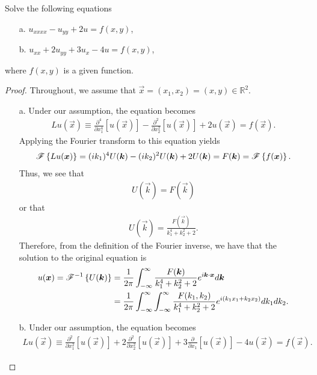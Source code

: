 \begin{problem}{2.54}
  Solve the following equations
  \begin{enumerate}
    \item[a.] $u_{xxxx} - u_{yy} + 2u = f(x,y)$,
    \item[b.] $u_{xx} + 2u_{yy} + 3 u_{x} -4u = f(x, y)$,
  \end{enumerate}
  where $f(x, y)$ is a given function.
\end{problem}

\begin{proof}
  Throughout, we assume that $\vec{x} = (x_1, x_2) = (x, y) \in \mathbb{R}^2$.
  \begin{enumerate}
    \item[a.] Under our assumption, the equation becomes
      \begin{align*}
        Lu(\vec{x}) \equiv \frac{\partial^4}{\partial x_1^4}\left[u(\vec{x})\right] - \frac{\partial^2}{\partial x_2^2}\left[u(\vec{x})\right] + 2u(\vec{x}) = f(\vec{x}).
      \end{align*}
      Applying the Fourier transform to this equation yields
      \begin{align*}
        \mathscr{F}\left\{ {Lu(\boldsymbol{x})} \right\}
        = (i k_1)^4 U(\boldsymbol{k}) - (ik_2)^2U(\boldsymbol{k}) + 2 U(\boldsymbol{k})
        = F(\boldsymbol{k})  = \mathscr{F}\left\{ {f(\boldsymbol{x})} \right\}.
      \end{align*}
      Thus, we see that
      \begin{align*}
        [k_1^4 + k_2^2 + 2]U(\vec{k}) = F(\vec{k})
      \end{align*}
      or that
      \begin{align*}
        U(\vec{k}) = \frac{F(\vec{k})}{k_1^4 + k_2^2 + 2}.
      \end{align*}
      Therefore, from the definition of the Fourier inverse, we have that the solution to the original
      equation is
      \begin{align*}
        u(\boldsymbol{x}) = \mathscr{F}^{-1}\left\{ {U(\boldsymbol{k})} \right\}
        &= \frac{1}{2\pi}\int_{-\infty}^\infty \frac{F(\boldsymbol{k})}{k_1^4 + k_2^2 + 2} e^{i \boldsymbol{k}\cdot \boldsymbol{x}} d\boldsymbol{k} \\
        &= \frac{1}{2\pi}\int_{-\infty}^\infty\int_{-\infty}^\infty \frac{F(k_1, k_2)}{k_1^4 + k_2^2 + 2} e^{i (k_1x_1 + k_2x_2)} dk_1dk_2.
      \end{align*}
    \item[b.] Under our assumption, the equation becomes
      \begin{align*}
        Lu(\vec{x}) \equiv \frac{\partial^2}{\partial x_1^2}\left[u(\vec{x})\right] + 2 \frac{\partial^2}{\partial x_2^2}\left[u(\vec{x})\right] + 3\frac{\partial}{\partial x_1}\left[u(\vec{x})\right]- 4u(\vec{x}) = f(\vec{x}).

\end{align*}
\end{enumerate}
\end{proof}
